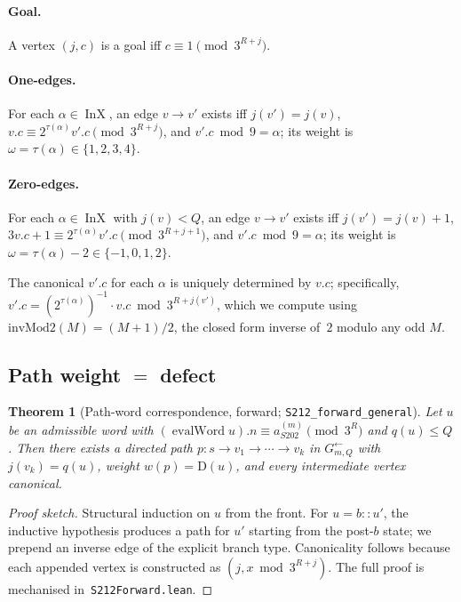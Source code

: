 \documentclass[11pt,a4paper]{article}
\theoremstyle{plain}
\newtheorem{theorem}{Theorem}[section]
\theoremstyle{definition}
\newcommand{\aSat}{a_{S202}^{(m)}}
\newcommand{\defect}{\mathrm{D}}
\newcommand{\InvG}{G^{\!\leftarrow}}
\DeclareMathOperator{\InX}{InX}
\DeclareMathOperator{\evalWord}{evalWord}
\begin{document}
\paragraph{Goal.} A vertex $(j, c)$ is a goal iff
$c \equiv 1 \pmod{3^{R+j}}$.

\paragraph{One-edges.} For each $\alpha \in \InX$, an edge
$v \to v'$ exists iff
$j(v') = j(v)$,
$v.c \equiv 2^{\tau(\alpha)} v'.c \pmod{3^{R+j}}$,
and $v'.c \bmod 9 = \alpha$;
its weight is $\omega = \tau(\alpha) \in \{1,2,3,4\}$.

\paragraph{Zero-edges.} For each $\alpha \in \InX$ with $j(v) < Q$,
an edge $v \to v'$ exists iff
$j(v') = j(v) + 1$,
$3 v.c + 1 \equiv 2^{\tau(\alpha)} v'.c \pmod{3^{R + j + 1}}$,
and $v'.c \bmod 9 = \alpha$;
its weight is $\omega = \tau(\alpha) - 2 \in \{-1, 0, 1, 2\}$.

\medskip
The canonical $v'.c$ for each $\alpha$ is uniquely determined by $v.c$;
specifically,
$v'.c = (2^{\tau(\alpha)})^{-1} \cdot v.c \bmod 3^{R+j(v')}$,
which we compute using $\mathrm{invMod2}(M) = (M+1)/2$, the closed form
inverse of~$2$ modulo any odd $M$.

\subsection{Path weight \texorpdfstring{$=$}{=} defect}

\begin{theorem}[Path-word correspondence, forward; \texttt{S212\_forward\_general}]\label{thm:s212-forward}
Let $u$ be an admissible word with
$(\evalWord u).n \equiv \aSat \pmod{3^R}$
and $q(u) \le Q$. Then there exists a directed path
$p : s \to v_1 \to \cdots \to v_k$ in $\InvG_{m, Q}$ with
$j(v_k) = q(u)$, weight $w(p) = \defect(u)$, and every intermediate
vertex canonical.
\end{theorem}

\begin{proof}[Proof sketch]
Structural induction on $u$ from the front. For $u = b :: u'$, the
inductive hypothesis produces a path for $u'$ starting from the
post-$b$ state; we prepend an inverse edge of the explicit branch
type. Canonicality follows because each appended vertex is
constructed as $(j, x \bmod 3^{R+j})$. The full proof is mechanised
in~\texttt{S212Forward.lean}.
\end{proof}
\end{document}

